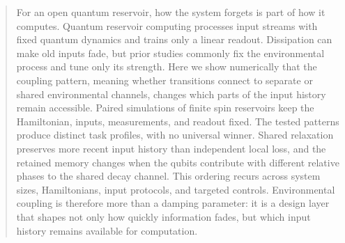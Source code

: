 \begin{abstract}
\small
For an open quantum reservoir, how the system forgets is part of how it
computes. Quantum reservoir computing processes input streams with fixed
quantum dynamics and trains only a linear readout. Dissipation can make old
inputs fade, but prior studies commonly fix the environmental process and tune
only its strength. Here we show numerically that the coupling pattern, meaning
whether transitions connect to separate or shared environmental channels,
changes which parts of the input history remain accessible. Paired simulations of
finite spin reservoirs keep the Hamiltonian, inputs, measurements, and readout
fixed. The tested patterns produce distinct task profiles, with no universal
winner. Shared relaxation preserves more recent input history than independent
local loss, and the retained memory changes when the qubits contribute with
different relative phases to the shared decay channel. This
ordering recurs across system sizes, Hamiltonians, input protocols, and targeted
controls.
Environmental coupling is therefore more than a damping parameter: it is a
design layer that shapes not only how quickly information fades, but which
input history remains available for computation.
\end{abstract}
